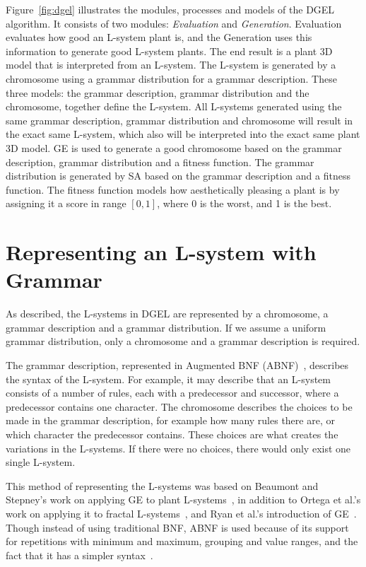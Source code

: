 Figure~\ref{fig:dgel} illustrates the modules, processes and models of the \gls{DGEL} algorithm.
It consists of two modules: \textit{Evaluation} and \textit{Generation}.
Evaluation evaluates how good an \gls{L-system} plant is, and the Generation uses this information to generate good \gls{L-system} plants.
The end result is a plant 3D model that is interpreted from an \gls{L-system}.
The \gls{L-system} is generated by a chromosome using a grammar distribution for a grammar description.
These three models: the grammar description, grammar distribution and the chromosome, together define the \gls{L-system}.
All \glspl{L-system} generated using the same grammar description, grammar distribution and chromosome will result in the exact same \gls{L-system}, which also will be interpreted into the exact same plant 3D model.
\gls{GE} is used to generate a good chromosome based on the grammar description, grammar distribution and a fitness function.
The grammar distribution is generated by \gls{SA} based on the grammar description and a fitness function.
The fitness function models how aesthetically pleasing a plant is by assigning it a score in range $[0, 1]$, where 0 is the worst, and 1 is the best.

\section{Representing an L-system with Grammar}
\label{sec:grammar}
As described, the \glspl{L-system} in \gls{DGEL} are represented by a chromosome, a grammar description and a grammar distribution.
If we assume a uniform grammar distribution, only a chromosome and a grammar description is required.

The grammar description, represented in Augmented BNF (ABNF)~\cite{RFC5234}, describes the syntax of the \gls{L-system}.
For example, it may describe that an \gls{L-system} consists of a number of rules, each with a predecessor and successor, where a predecessor contains one character.
The chromosome describes the choices to be made in the grammar description, for example how many rules there are, or which character the predecessor contains.
These choices are what creates the variations in the \glspl{L-system}.
If there were no choices, there would only exist one single \gls{L-system}.

This method of representing the \glspl{L-system} was based on Beaumont and Stepney's work on applying \gls{GE} to plant \glspl{L-system}~\cite{2009Beaumont}, in addition to Ortega et al.'s work on applying it to fractal \glspl{L-system}~\cite{2003Ortega}, and Ryan et al.'s introduction of \gls{GE}~\cite{1998Ryan}.
Though instead of using traditional BNF, ABNF is used because of its support for repetitions with minimum and maximum, grouping and value ranges, and the fact that it has a simpler syntax~\cite{RFC5234}.

